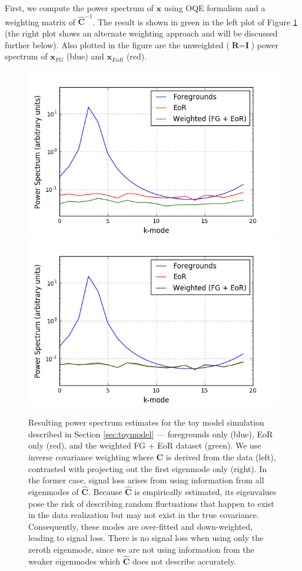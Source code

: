 \documentclass[preprint2,numberedappendix,tighten]{aastex6}  %
\begin{document}
First, we compute the power spectrum of $\textbf{x}$ using OQE formalism and a weighting matrix of $\hat{\textbf{C}}^{-1}$. The result is shown in green in the left plot of Figure \ref{fig:toy_sigloss3} (the right plot shows an alternate weighting approach and will be discussed further below). Also plotted in the figure are the unweighted ($\textbf{R} = \textbf{I}$) power spectrum of $\textbf{x}_{FG}$ (blue) and $\textbf{x}_{EoR}$ (red). 

\begin{figure}
	\centering
	\includegraphics[trim={0.3cm 0.2cm 1cm 0.3cm},clip,height=0.3\textwidth]{plots/toy_sigloss3.png}
	\includegraphics[trim={1cm 0.2cm 0cm 0.3cm},clip,height=0.3\textwidth]{plots/toy_sigloss4.png}
	\caption{Resulting power spectrum estimates for the toy model simulation described in Section \ref{sec:toymodel} --- foregrounds only (blue), EoR only (red), and the weighted FG + EoR dataset (green). We use inverse covariance weighting where $\textbf{C}$ is derived from the data (left), contrasted with projecting out the first eigenmode only (right). In the former case, signal loss arises from using information from all eigenmodes of $\hat{\textbf{C}}$. Because $\hat{\textbf{C}}$ is empirically estimated, its eigenvalues pose the risk of describing random fluctuations that happen to exist in the data realization but may not exist in the true covariance. Consequently, these modes are over-fitted and down-weighted, leading to signal loss. There is no signal loss when using only the zeroth eigenmode, since we are not using information from the weaker eigenmodes which $\hat{\textbf{C}}$ does not describe accurately.}
	\label{fig:toy_sigloss3}
\end{figure}
\end{document}

